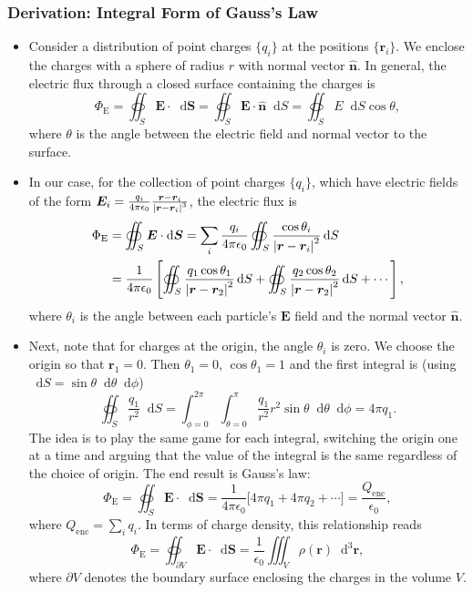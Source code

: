 \documentclass[11pt, a4paper]{article}
\newcommand{\diff}{\mathop{}\!\mathrm{d}} %
\newcommand{\dr}{\diff^{3} \r}  %
\renewcommand{\vec}[1]{\bm{#1}} %
\newcommand{\uvec}[1]{\hat{\vec{#1}}} %
\renewcommand{\r}{\vec{r}}
\newcommand{\E}{\vec{E}} %
\renewcommand{\S}{\mathbf{S}}  %
\newcommand{\ee}{\epsilon_{0}}  %
\begin{document}
\subsubsection{Derivation: Integral Form of Gauss's Law}
\begin{itemize}
	\item Consider a distribution of point charges $ \{q_{i}\} $ at the positions $ \{\r_{i}\} $. We enclose the charges with a sphere of radius $ r $ with normal vector $ \uvec{n} $. In general, the electric flux through a closed surface containing the charges is
	\begin{equation*}
		\Phi_{\text{E}} = \oiint_{S} \E \cdot \diff \vec{S} = \oiint_{S} \E \cdot \uvec{n} \diff S = \oiint_{S} E \diff S \cos \theta,
	\end{equation*}
	where $ \theta $ is the angle between the electric field and normal vector to the surface.
	
    \item In our case, for the collection of point charges $ \{q_{i}\} $, which have electric fields of the form $ \E_{i} = \frac{q_{i}}{4\pi \ee}\frac{\r - \r_{i}}{\abs{\r - \r_{i}}^{3}} $, the electric flux is
	\begin{align*}
		\Phi_{\text{E}} &= \oiint_{S} \E \cdot \diff \vec{S} = \sum_{i} \frac{q_{i}}{4\pi \ee} \oiint_{S} \frac{\cos \theta_{i}}{\abs{\r - \r_{i}}^{2}} \diff S \\
		& = \frac{1}{4\pi \ee} \left[ \oiint_{S} \frac{ q_{1} \cos \theta_{1}}{\abs{\r - \r_{2}}^{2}} \diff S + \oiint_{S} \frac{ q_{2} \cos \theta_{2}}{\abs{\r - \r_{2}}^{2}} \diff S  + \cdots \right],
	\end{align*}
	where $ \theta_{i} $ is the angle between each particle's $ \E $ field and the normal vector $ \uvec{n} $. 
	
	\item Next, note that for charges at the origin, the angle $ \theta_{i} $  is zero. We choose the origin so that $ \r_{1} = 0 $. Then $ \theta_{1} = 0 $, $ \cos \theta_{1} = 1 $ and the first integral is (using $ \diff S = \sin \theta \diff \theta \diff \phi $)
	\begin{equation*}
		\oiint_{S} \frac{q_{1}}{r^{2}} \diff S = \int_{\phi = 0}^{2\pi} \int_{\theta = 0}^{\pi} \frac{q_{1}}{r^{2}}r^{2} \sin \theta \diff \theta \diff \phi = 4\pi q_{1}.
	\end{equation*}
	The idea is to play the same game for each integral, switching the origin one at a time and arguing that the value of the integral is the same regardless of the choice of origin. The end result is Gauss's law:
	\begin{equation*}
		\Phi_{\text{E}} = \oiint_{S} \E \cdot \diff \S = \frac{1}{4\pi \ee} \big[4\pi q_{1} + 4\pi q_{2} + \cdots \big] = \frac{Q_{\text{enc}}}{\ee},
	\end{equation*}
	where $ Q_{\text{enc}} = \sum_{i} q_{i} $. In terms of charge density, this relationship reads
	\begin{equation*}
		\Phi_{\text{E}} = \oiint_{\partial V} \E \cdot \diff \vec{S} = \frac{1}{\ee}\iiint_{V} \rho(\r) \dr,
	\end{equation*}
	where $ \partial V $ denotes the boundary surface enclosing the charges in the volume $ V $.
	

\end{itemize}
\end{document}
